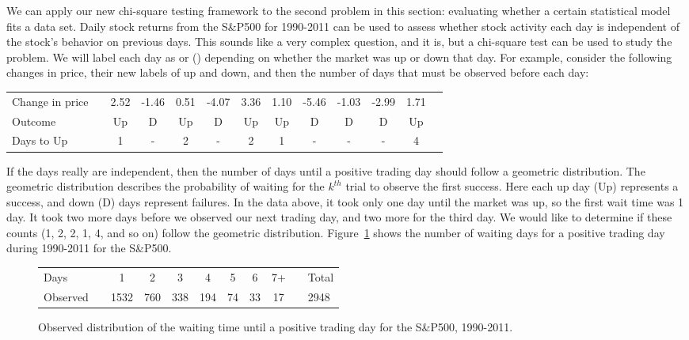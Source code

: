 
We can apply our new chi-square testing framework to the second problem in this section: evaluating whether a certain statistical model fits a data set. Daily stock returns from the S\&P500 for 1990-2011 can be used to assess whether stock activity each day is independent of the stock's behavior on previous days. This sounds like a very complex question, and it is, but a chi-square test can be used to study the problem. We will label each day as  or  () depending on whether the market was up or down that day. For example, consider the following changes in price, their new labels of up and down, and then the number of days that must be observed before each  day:
\begin{center}\footnotesize
\begin{tabular}{lc ccc ccc ccc cc}
Change in price		&\hspace{-1mm}	& \footnotesize2.52 &
	\footnotesize-1.46 & \footnotesize 0.51 &
	\footnotesize-4.07 & \footnotesize3.36 &
	\footnotesize1.10 &
	\footnotesize-5.46 & \footnotesize-1.03 & \footnotesize-2.99 & \footnotesize1.71 \\
Outcome	 & \hspace{-1mm} &
	Up &
	D & Up &
	D & Up &
	Up &
	D & D & D & Up \\
\footnotesize Days to Up & \hspace{-1mm} & 1 & - & 2 & - & 2 & 1 & - & - & - & 4 \\
\end{tabular}
\end{center}
If the days really are independent, then the number of days until a positive trading day should follow a geometric distribution. The geometric distribution describes the probability of waiting for the $k^{th}$ trial to observe the first success. Here each up day (Up) represents a success, and down (D) days represent failures. In the data above, it took only one day until the market was up, so the first wait time was 1 day. It took two more days before we observed our next  trading day, and two more for the third  day. We would like to determine if these counts (1, 2, 2, 1, 4, and so on) follow the geometric distribution. Figure~\ref{sAndP500For1990To2011TimeToPosTrade} shows the number of waiting days for a positive trading day during 1990-2011 for the S\&P500.

\begin{figure}[h]
\centering
\begin{tabular}{ll ccc ccc c ll}
\hline
Days	 & \hspace{2mm} & 1 & 2 & 3 & 4 & 5 & 6 & 7+ & \hspace{2mm} & Total \\
Observed &		& 1532 & 760 & 338 & 194 & 74 & 33 & 17 & & 2948 \\
\hline
\end{tabular}
\caption{Observed distribution of the waiting time until a positive trading day for the S\&P500, 1990-2011.}
\label{sAndP500For1990To2011TimeToPosTrade}
\end{figure}

